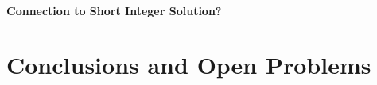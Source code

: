 \documentclass[letterpaper,twocolumn,10pt]{article}
\begin{document}
\paragraph{Connection to Short Integer Solution?} 

\section{Conclusions and Open Problems}




{\footnotesize 
}


\end{document}

